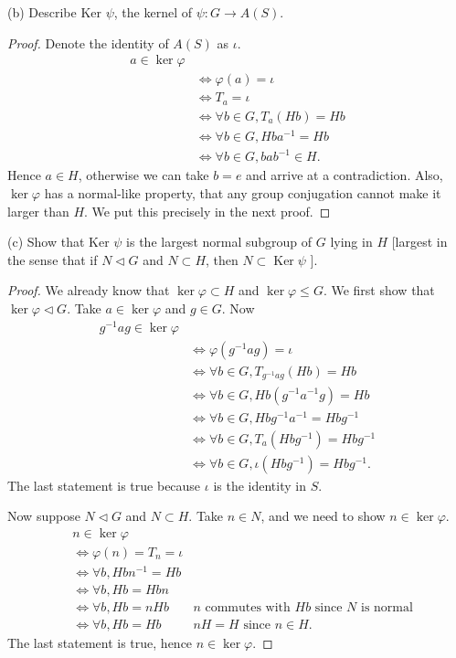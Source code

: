 \begin{enumerate}
(b) Describe Ker $\psi$, the kernel of $\psi: G \rightarrow A(S)$.
\begin{proof}
	Denote the identity of $A(S)$ as $\iota$.
	\begin{align*}
		a \in \operatorname{ker} \varphi \\
		&\iff \varphi(a) = \iota\\
		&\iff T_a = \iota\\
		&\iff \forall b \in G, T_a(Hb) = Hb\\
		&\iff \forall b \in G, Hba^{-1} =Hb\\
		&\iff \forall b \in G, bab^{-1} \in H
	.\end{align*}
	Hence $a \in H$, otherwise we can take $b = e$ and arrive at a contradiction. Also, $\operatorname{ker} \varphi$ has a normal-like property, that any group conjugation cannot make it larger than $H$. We put this precisely in the next proof.
\end{proof}

(c) Show that Ker $\psi$ is the largest normal subgroup of $G$ lying in $H$ [largest in the sense that if $N \triangleleft G$ and $N \subset H$, then $N \subset \operatorname{Ker} \psi$ ].
\begin{proof}
	We already know that $\operatorname{ker} \varphi \subset H$ and $\operatorname{ker} \varphi \le G$. We first show that $\operatorname{ker} \varphi \triangleleft  G$. Take $a \in \operatorname{ker} \varphi$ and $g \in G$. Now
	\begin{align*}
	g^{-1} a g \in \operatorname{ker} \varphi\\	
	&\iff \varphi(g^{-1} ag) = \iota \\
	&\iff \forall b \in G, T_{g^{-1} ag}(Hb) = Hb \\
	&\iff \forall b \in G, Hb(g^{-1} a^{-1}g) = Hb \\
	&\iff  \forall b \in G, Hbg^{-1}a^{-1}   = Hbg^{-1} \\
	&\iff  \forall b \in G,  T_{a}(Hbg^{-1} )= Hbg^{-1}  \\
	&\iff  \forall b \in G,  \iota(Hbg^{-1} )= Hbg^{-1} 
	.\end{align*}
	The last statement is true because  $\iota$ is the identity in $S$.

	Now suppose $N \triangleleft G$ and $N \subset H$. Take $n \in N$, and we need to show $n \in \operatorname{ker} \varphi$. 
	\begin{align*}
		&n \in \operatorname{ker} \varphi\\
		&\iff \varphi(n) = T_n = \iota \\
		&\iff \forall b, H b n^{-1}   = H b \\
		&\iff \forall b,H  b = H bn \\
		&\iff \forall b,H  b = nH b 
		& \text{$n$ commutes with $Hb$ since $N$ is normal}\\
		&\iff \forall b,H  b = H b 
		& \text{$nH=H$ since $n \in H$}
	.\end{align*}
	The last statement is true, hence $n \in \operatorname{ker} \varphi$.
\end{proof}


\end{enumerate}
